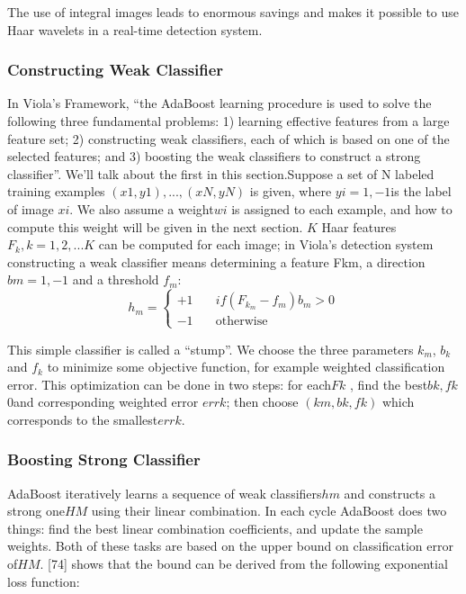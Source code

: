 \documentclass[12pt, twoside]{report}
\begin{document}
	\par
	The use of integral images leads to enormous savings and makes it possible to use Haar
	wavelets in a real-time detection system.
	\subsubsection{Constructing Weak Classifier}
	
	\par
	In Viola’s Framework, ``the AdaBoost learning procedure is used to solve the following
	three fundamental problems: 1) learning effective features from a large feature set; 2)
	constructing weak classifiers, each of which is based on one of the selected features; and
	3) boosting the weak classifiers to construct a strong classifier''. We’ll talk about the
	first in this section.Suppose a set of N labeled training examples $(x1, y1), . . . ,(xN , yN )$ is given, where
	$yi = {1, −1} $is the label of image $xi$. We also assume a weight$ wi$ is assigned to each example, and how to compute this weight will be given in the next section. $K$ Haar features $F_k, k = 1, 2, . . . K$ can be computed for each image; in Viola’s detection system constructing a weak classifier means determining a feature Fkm, a direction $bm = {1, −1}$ and a threshold $f_m$:
	\[
		h_m = \begin{cases}
			+1  & \quad \text{$if (F_{k_m} - f_m) b_m > 0$} \\
			-1  & \quad \text{otherwise}
			\end{cases}
	\]
	\newpage
	\par
	This simple classifier is called a “stump”. We choose the three parameters $k_m$, $b_k$ and $f_k$ to minimize some objective function, for example weighted classification error. This
	optimization can be done in two steps: for each$ Fk$ , find the best$ bk, fk $0and corresponding
	weighted error $errk$; then choose $(km, bk, fk)$ which corresponds to the smallest$ errk$.
	\subsubsection{Boosting Strong Classifier}
	
	\par
	AdaBoost iteratively learns a sequence of weak classifiers$ hm$ and constructs a strong one$
	HM$ using their linear combination. In each cycle AdaBoost does two things: find the best
	linear combination coefficients, and update the sample weights. Both of these tasks are
	based on the upper bound on classification error of$ HM$. [74] shows that the bound can be
	derived from the following exponential loss function:
	
\end{document}
